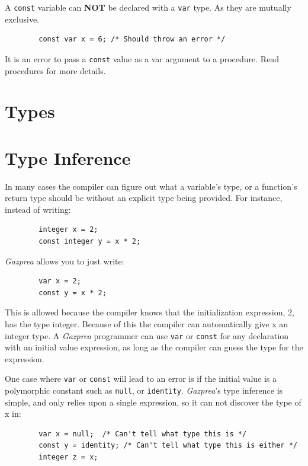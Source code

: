 \documentclass{article}
\begin{document}
	A \texttt{const} variable can \textbf{NOT} be declared with a \texttt{var} type. As they are mutually exclusive.

	\begin{lstlisting}
		const var x = 6; /* Should throw an error */
	\end{lstlisting}

	It is an error to pass a \texttt{const} value as a var argument to a procedure.  Read procedures for more details.


\section{Types}
\label{sec:types}



\section{Type Inference}\label{sec:typeInference}


	In many cases the compiler can figure out what a variable's type, or a function's return type should be without an
	explicit type being provided. For instance, instead of writing:

	\begin{lstlisting}
		integer x = 2;
		const integer y = x * 2;
	\end{lstlisting}

	\textit{Gazprea} allows you to just write:

	\begin{lstlisting}
		var x = 2;
		const y = x * 2;
	\end{lstlisting}

	This is allowed because the compiler knows that the initialization expression, 2, has the type integer. Because of
	this the compiler can automatically give x an integer type. A \textit{Gazprea} programmer can use \texttt{var} or
	\texttt{const} for any declaration with an initial value expression, as long as the compiler can guess the type for
	the expression.

	One case where \texttt{var} or \texttt{const} will lead to an error is if the initial value is a polymorphic
	constant such as \texttt{null}, or \texttt{identity}.  \textit{Gazprea}'s type inference is simple, and only relies
	upon a single expression, so it can not discover the type of x in:

	\begin{lstlisting}
		var x = null;  /* Can't tell what type this is */
		const y = identity; /* Can't tell what type this is either */
		integer z = x;
	\end{lstlisting}
\end{document}
